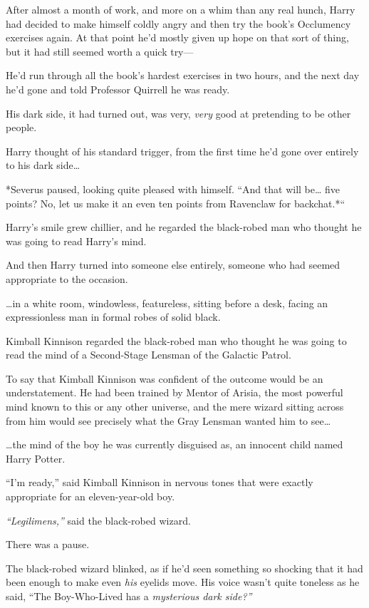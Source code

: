 After almost a month of work, and more on a whim than any real hunch,
Harry had decided to make himself coldly angry and then try the book's
Occlumency exercises again. At that point he'd mostly given up hope on
that sort of thing, but it had still seemed worth a quick try---

He'd run through all the book's hardest exercises in two hours, and the
next day he'd gone and told Professor Quirrell he was ready.

His dark side, it had turned out, was very, \emph{very} good at
pretending to be other people.

Harry thought of his standard trigger, from the first time he'd gone
over entirely to his dark side\ldots{}

*Severus paused, looking quite pleased with himself. ``And that will
be\ldots{} five points? No, let us make it an even ten points from
Ravenclaw for backchat.*``

Harry's smile grew chillier, and he regarded the black-robed man who
thought he was going to read Harry's mind.

And then Harry turned into someone else entirely, someone who had seemed
appropriate to the occasion.

\ldots{}in a white room, windowless, featureless, sitting before a desk,
facing an expressionless man in formal robes of solid black.

Kimball Kinnison regarded the black-robed man who thought he was going
to read the mind of a Second-Stage Lensman of the Galactic Patrol.

To say that Kimball Kinnison was confident of the outcome would be an
understatement. He had been trained by Mentor of Arisia, the most
powerful mind known to this or any other universe, and the mere wizard
sitting across from him would see precisely what the Gray Lensman wanted
him to see\ldots{}

\ldots{}the mind of the boy he was currently disguised as, an innocent
child named Harry Potter.

``I'm ready,'' said Kimball Kinnison in nervous tones that were exactly
appropriate for an eleven-year-old boy.

\emph{``Legilimens,''} said the black-robed wizard.

There was a pause.

The black-robed wizard blinked, as if he'd seen something so shocking
that it had been enough to make even \emph{his} eyelids move. His voice
wasn't quite toneless as he said, ``The Boy-Who-Lived has a
\emph{mysterious dark side?''}

